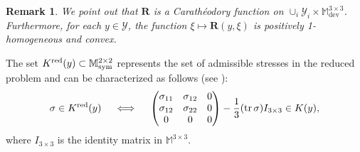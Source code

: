 \documentclass[reqno,10pt]{amsart}
\numberwithin{equation}{section}
\newtheorem{remark}[theorem]{Remark}
\theoremstyle{remark}
\newcommand{\RED}{\color{black}}
\newcommand{\BLACK}{\color{black}}
\newcommand{\M}{\mathbb{M}}
\newcommand{\calY}{\mathcal{Y}}
\DeclareMathOperator{\dev}{dev}
\DeclareMathOperator{\sym}{sym}
\DeclareMathOperator{\tr}{{\rm tr}}
\newcommand{\disspot}{\mathbf{R}}
\newcommand{\red}[1]{#1^{\rm red}}
\begin{document}
\begin{remark} \label{remark on Reshetnyak theorem conditions - new disspot}
We point out that $\disspot$ is a Carath\'{e}odory function on $\cup_i\calY_i \times \M^{3 \times 3}_{\dev}$. 
Furthermore, for each $y \in \calY$, the function $\xi \mapsto \disspot(y, \xi)$ is positively 1-homogeneous and convex.
\end{remark}


\medskip
{} \nopagebreak

The set $\red{K}(y) \subset \M^{2 \times 2}_{\sym}$ represents the set of admissible stresses in the reduced problem and can be {\RED characterized \BLACK}as follows (see \cite[Section 3.2]{Davoli.Mora.2013}):
\begin{equation} \label{K_r characherization}
	\sigma \in \red{K}(y)
	\quad \iff \quad 
	\begin{pmatrix}
	\sigma_{11} & \sigma_{12} & 0 \\
	\sigma_{12} & \sigma_{22} & 0 \\
	0 & 0 & 0
	\end{pmatrix}
	- \frac{1}{3}(\tr \sigma)I_{3 \times 3} \in K(y),
\end{equation}
where $I_{3 \times 3}$ is the identity matrix in $\M^{3 \times 3}$.
\end{document}
